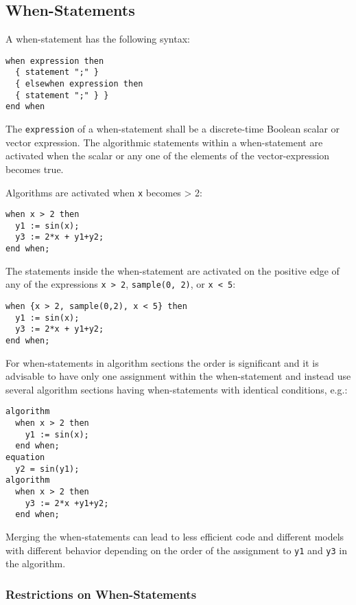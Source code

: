 \subsection{When-Statements}\label{when-statements}

A when-statement has the following syntax:
\begin{lstlisting}[language=grammar]
when expression then
  { statement ";" }
  { elsewhen expression then
  { statement ";" } }
end when
\end{lstlisting}
The \lstinline!expression! of a when-statement shall be a discrete-time Boolean
scalar or vector expression. The algorithmic statements within a
when-statement are activated when the scalar or any one of the elements
of the vector-expression becomes true.

\begin{example}
Algorithms are activated when \lstinline!x! becomes \textgreater{} 2:
\begin{lstlisting}[language=modelica]
when x > 2 then
  y1 := sin(x);
  y3 := 2*x + y1+y2;
end when;
\end{lstlisting}
The statements inside the when-statement are activated on the positive edge of any of the expressions
\lstinline!x > 2!, \lstinline!sample(0, 2)!, or \lstinline!x < 5!:
\begin{lstlisting}[language=modelica]
when {x > 2, sample(0,2), x < 5} then
  y1 := sin(x);
  y3 := 2*x + y1+y2;
end when;
\end{lstlisting}
For when-statements in algorithm sections the order is significant
and it is advisable to have only one assignment within the
when-statement and instead use several algorithm sections having
when-statements with identical conditions, e.g.:
\begin{lstlisting}[language=modelica]
algorithm
  when x > 2 then
    y1 := sin(x);
  end when;
equation
  y2 = sin(y1);
algorithm
  when x > 2 then
    y3 := 2*x +y1+y2;
  end when;
\end{lstlisting}
Merging the when-statements can lead to less efficient code and
different models with different behavior depending on the order of the
assignment to \lstinline!y1! and \lstinline!y3! in the algorithm.
\end{example}

\subsubsection{Restrictions on When-Statements}\label{restrictions-on-when-statements}

